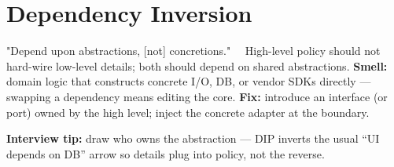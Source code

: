 \section{Dependency Inversion}
\label{sec:dip}
    "Depend upon abstractions, [not] concretions."~\cite{dip}~\cite{martin-pap}
    \newline
    High-level policy should not hard-wire low-level details; both should depend on shared abstractions.
    \newline
    \textbf{Smell:} domain logic that constructs concrete I/O, DB, or vendor SDKs directly --- swapping a dependency means editing the core.
    \newline
    \textbf{Fix:} introduce an interface (or port) owned by the high level; inject the concrete adapter at the boundary.
    \par\noindent\textbf{Interview tip:} draw who owns the abstraction --- DIP inverts the usual ``UI depends on DB'' arrow so details plug into policy, not the reverse.

